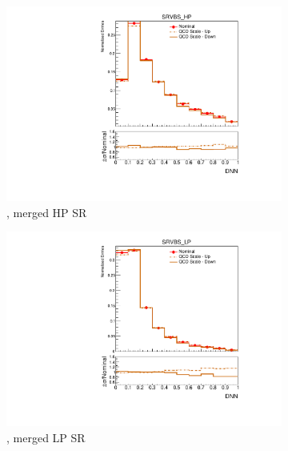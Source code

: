 \begin{figure}[ht]
\begin{subfigure}[b]{0.3\textwidth}
        \includegraphics[width=\textwidth]{figures/1lep/PDFUnc/QCDScale/ttbar_0ptag1pfat0pjet_0ptv_SRVBS_HP_DNN_SysTheoryQCD_ttbar__1up_Norm.pdf}
        \caption{\ttbar, merged HP SR}
    \end{subfigure}
    \begin{subfigure}[b]{0.3\textwidth}
        \includegraphics[width=\textwidth]{figures/1lep/PDFUnc/QCDScale/ttbar_0ptag1pfat0pjet_0ptv_SRVBS_LP_DNN_SysTheoryQCD_ttbar__1up_Norm.pdf}
        \caption{\ttbar, merged LP SR}
    \end{subfigure}
    \\
    \vspace{15mm}
    \begin{subfigure}[b]{0.3\textwidth}

\end{subfigure}
\end{figure}
